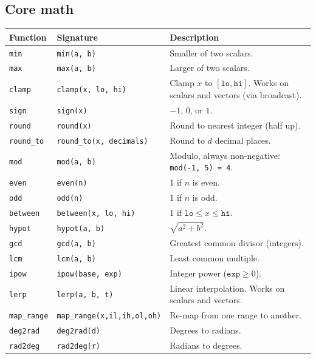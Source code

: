 \documentclass[11pt,a4paper]{article}
\begin{document}
\subsection{Core math}

\begin{longtable}{@{}L{3.5cm}L{4.5cm}L{6.5cm}@{}}
\toprule
\textbf{Function} & \textbf{Signature} & \textbf{Description} \\
\midrule
\endhead
\texttt{min}       & \texttt{min(a, b)}                  & Smaller of two scalars. \\
\texttt{max}       & \texttt{max(a, b)}                  & Larger of two scalars. \\
\texttt{clamp}     & \texttt{clamp(x, lo, hi)}           & Clamp $x$ to $[\texttt{lo}, \texttt{hi}]$. Works on scalars and vectors (via broadcast). \\
\texttt{sign}      & \texttt{sign(x)}                    & $-1$, $0$, or $1$. \\
\texttt{round}     & \texttt{round(x)}                   & Round to nearest integer (half up). \\
\texttt{round\_to} & \texttt{round\_to(x, decimals)}     & Round to $d$ decimal places. \\
\texttt{mod}       & \texttt{mod(a, b)}                  & Modulo, always non-negative: \texttt{mod(-1, 5) = 4}. \\
\texttt{even}      & \texttt{even(n)}                    & 1 if $n$ is even. \\
\texttt{odd}       & \texttt{odd(n)}                     & 1 if $n$ is odd. \\
\texttt{between}   & \texttt{between(x, lo, hi)}         & 1 if $\texttt{lo} \le x \le \texttt{hi}$. \\
\texttt{hypot}     & \texttt{hypot(a, b)}                & $\sqrt{a^2 + b^2}$. \\
\texttt{gcd}       & \texttt{gcd(a, b)}                  & Greatest common divisor (integers). \\
\texttt{lcm}       & \texttt{lcm(a, b)}                  & Least common multiple. \\
\texttt{ipow}      & \texttt{ipow(base, exp)}            & Integer power ($\texttt{exp} \ge 0$). \\
\texttt{lerp}      & \texttt{lerp(a, b, t)}              & Linear interpolation. Works on scalars and vectors. \\
\texttt{map\_range}& \texttt{map\_range(x,il,ih,ol,oh)}  & Re-map from one range to another. \\
\texttt{deg2rad}   & \texttt{deg2rad(d)}                 & Degrees to radians. \\
\texttt{rad2deg}   & \texttt{rad2deg(r)}                 & Radians to degrees. \\
\bottomrule
\end{longtable}
\end{document}
